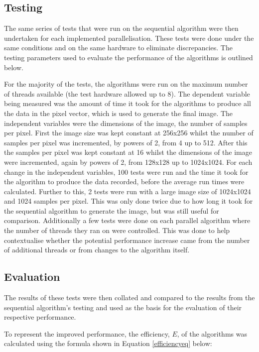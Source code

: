 \documentclass[12pt,journal,transmag]{IEEEtran}
\begin{document}
	\subsection{Testing}
	The same series of tests that were run on the sequential algorithm were then undertaken for each implemented parallelisation. These tests were done under the same conditions and on the same hardware to eliminate discrepancies. The testing parameters used to evaluate the performance of the algorithms is outlined below.
	
	For the majority of the tests, the algorithms were run on the maximum number of threads available (the test hardware allowed up to 8). The dependent variable being measured was the amount of time it took for the algorithms to produce all the data in the pixel vector, which is used to generate the final image. The independent variables were the dimensions of the image, the number of samples per pixel. First the image size was kept constant at 256x256 whilst the number of samples per pixel was incremented, by powers of 2, from 4 up to 512. After this the samples per pixel was kept constant at 16 whilst the dimensions of the image were incremented, again by powers of 2, from 128x128 up to 1024x1024. For each change in the independent variables, 100 tests were run and the time it took for the algorithm to produce the data recorded, before the average run times were calculated. Further to this, 2 tests were run with a large image size of 1024x1024 and 1024 samples per pixel. This was only done twice due to how long it took for the sequential algorithm to generate the image, but was still useful for comparison. Additionally a few tests were done on each parallel algorithm where the number of threads they ran on were controlled. This was done to help contextualise whether the potential performance increase came from the number of additional threads or from changes to the algorithm itself.
	
	\subsection{Evaluation}
	The results of these tests were then collated and compared to the results from the sequential algorithm's testing and used as the basis for the evaluation of	their respective performance.
	
	To represent the improved performance, the efficiency, $E$, of the algorithms was calculated using the formula shown in Equation \ref{efficiencyeq} below:
	
\end{document}
